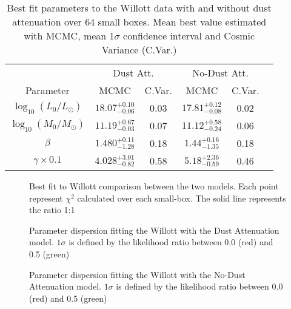 \documentclass{emulateapj}
\begin{document}
\begin{table}
\begin{center}
\begin{tabular}{cccccc}\hline\hline
 & \multicolumn{2}{c}{Dust Att.} & \multicolumn{2}{c}{No-Dust Att.}\\
Parameter                  & MCMC                  & C.Var. & MCMC                    & C.Var. \\\hline
$\log_{10}(L_0/L_{\odot})$ & $18.07_{-0.06}^{+0.10}$ & 0.03 & $17.81_{-0.08}^{+0.12}$ & 0.02  \\
$\log_{10}(M_0/M_{\odot})$ & $11.19_{-0.03}^{+0.67}$ & 0.07 & $11.12_{-0.24}^{+0.58}$ & 0.06  \\
$\beta$                    & $1.480_{-1.28}^{+0.11}$ & 0.18 & $ 1.44_{-1.35}^{+0.16}$ & 0.18  \\
$\gamma\times0.1$          & $4.028_{-0.82}^{+3.01}$ & 0.58 & $ 5.18_{-0.59}^{+2.36}$ & 0.46  \\
\hline\hline
\end{tabular}
\caption{ Best fit parameters to the Willott data with and without 
dust attenuation over 64 small boxes. Mean best value estimated 
with MCMC, mean $1\sigma$ confidence interval and Cosmic Variance
(C.Var.)
} 
\label{table:Willott_best_fit_parameters_no_dust}
\end{center}
\end{table}


\begin{figure}
\caption{Best fit to Willott comparison between the two models. Each point represent $\chi^2$ 
calculated over each small-box. The solid line represents the ratio 1:1 }
\label{fig:OD1_chi2_comparison}
\end{figure}

\begin{figure}
\caption{Parameter dispersion fitting the Willott with the Dust Attenuation model. 
$1\sigma$ is defined by the likelihood ratio between 0.0 (red) and 0.5 (green)}
\label{fig:OD1_MCMC_best_steps_w}
\end{figure}

\begin{figure}
\caption{Parameter dispersion fitting the Willott with the No-Dust Attenuation model. 
$1\sigma$ is defined by the likelihood ratio between 0.0 (red) and 0.5 (green)}
\label{fig:OD1_MCMC_best_steps_wo}
\end{figure}
\end{document}
